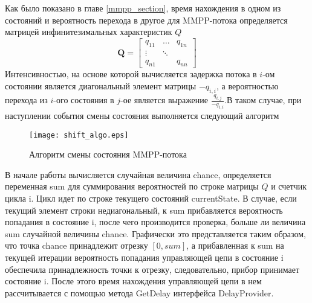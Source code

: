 Как было показано в главе \ref{mmpp_section}, время нахождения в одном из состояний и вероятность перехода в другое для MMPP-потока определяется матрицей инфинитезимальных характеристик $Q$
\begin{equation*}
	\boldsymbol{Q}=\begin{bmatrix}
		q_{11} &  \dots &  q_{1n}\\
		\vdots & \ddots &  \\
		q_{n1} &    	&	q_{nn}
	\end{bmatrix}
\end{equation*}
Интенсивностью, на основе которой вычисляется задержка потока в $i$-ом состоянии является диагональный элемент матрицы $-q_{i,i}$, а вероятностью перехода из $i$-ого состояния в $j$-ое является выражение $\frac{q_{i,j}}{-q_{i,i}}$.В таком случае, при наступлении события смены состояния выполняется следующий алгоритм
   \begin{figure}[H]
  	\centering
  	\texttt{[image: shift\_algo.eps]}
  	\caption{Алгоритм смены состояния MMPP-потока}
  	\label{shift_algo_uml}
  \end{figure}
В начале работы вычисляется случайная величина chance, определяется переменная sum для суммирования вероятностей по строке матрицы $Q$ и счетчик цикла i. Цикл идет по строке текущего состояний currentState. В случае, если текущий элемент строки недиагональный, к sum прибавляется вероятность попадания в состояние i, после чего производится проверка, больше ли величина sum случайной величины chance. Графически это представляется таким образом, что точка chance принадлежит отрезку $[0,sum]$, а прибавленная к sum на текущей итерации вероятность попадания управляющей цепи в состояние i обеспечила принадлежность точки к отрезку, следовательно, прибор принимает состояние i. После этого время нахождения управляющей цепи в нем рассчитывается с помощью метода GetDelay интерфейса DelayProvider.
\clearpage
